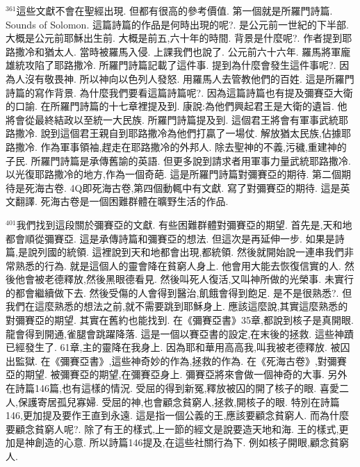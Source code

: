 \documentclass{book}
\begin{document}
$^{361}$這些文獻不會在聖經出現.
但都有很高的參考價值.
第一個就是所羅門詩篇.
Sounds of Solomon.
這篇詩篇的作品是何時出現的呢?.
是公元前一世紀的下半部.
大概是公元前耶穌出生前.
大概是前五,六十年的時間.
背景是什麼呢?.
作者提到耶路撒冷和猶太人.
當時被羅馬入侵.
上課我們也說了.
公元前六十六年.
羅馬將軍龐雄統攻陷了耶路撒冷.
所羅門詩篇記載了這件事.
提到為什麼會發生這件事呢?.
因為人沒有敬畏神.
所以神向以色列人發怒.
用羅馬人去管教他們的百姓.
這是所羅門詩篇的寫作背景.
為什麼我們要看這篇詩篇呢?.
因為這篇詩篇也有提及彌賽亞大衛的口諭.
在所羅門詩篇的十七章裡提及到.
康說:為他們興起君王是大衛的遺旨.
他將會從最終結政以至統一大民族.
所羅門詩篇提及到.
這個君王將會有軍事武統耶路撒冷.
說到這個君王親自到耶路撒冷為他們打贏了一場仗.
解放猶太民族,佔據耶路撒冷.
作為軍事領袖,趕走在耶路撒冷的外邦人.
除去聖神的不義,污穢,重建神的子民.
所羅門詩篇是承傳舊諭的英語.
但更多說到請求者用軍事力量武統耶路撒冷.
以光復耶路撒冷的地方,作為一個奇葩.
這是所羅門詩篇對彌賽亞的期待.
第二個期待是死海古卷.
4Q即死海古卷,第四個動輒中有文獻.
寫了對彌賽亞的期待.
這是英文翻譯.
死海古卷是一個困難群體在曠野生活的作品.

$^{401}$我們找到這段關於彌賽亞的文獻.
有些困難群體對彌賽亞的期望.
首先是,天和地都會順從彌賽亞.
這是承傳詩篇和彌賽亞的想法.
但這次是再延伸一步.
如果是詩篇,是說列國的統領.
這裡說到天和地都會出現,都統領.
然後就開始說一連串我們非常熟悉的行為.
就是這個人的靈會降在貧窮人身上.
他會用大能去恢復信實的人.
然後他會被老德釋放,然後黑眼德看見.
然後叫死人復活,又叫神所做的光榮事.
未實行的都會繼續做下去.
然後受傷的人會得到醫治,飢餓會得到飽足.
是不是很熟悉?.
但我們在這麼熟悉的想法之前,就不需要跳到耶穌身上.
應該這麼說,其實這麼熟悉的對彌賽亞的期望.
其實在舊約也能找到.
在《彌賽亞書》35章,都說到核子是真開眼.
龍會得到開通,雀腿會跳躍降落.
這是一個以賽亞書的設定,在末後的拯救.
這些神蹟已經發生了.
61章,主的靈降在我身上.
因為耶和華用高高我,叫我被老德釋放.
被囚出監獄.
在《彌賽亞書》,這些神奇妙的作為,拯救的作為.
在《死海古卷》,對彌賽亞的期望.
被彌賽亞的期望,在彌賽亞身上.
彌賽亞將來會做一個神奇的大事.
另外在詩篇146篇,也有這樣的情況.
受屈的得到新冤,釋放被囚的開了核子的眼.
喜愛二人,保護寄居孤兒寡婦.
受屈的神,也會顧念貧窮人,拯救,開核子的眼.
特別在詩篇146,更加提及要作王直到永遠.
這是指一個公義的王,應該要顧念貧窮人.
而為什麼要顧念貧窮人呢?.
除了有王的樣式,上一節的經文是說要造天地和海.
王的樣式,更加是神創造的心意.
所以詩篇146提及,在這些社關行為下.
例如核子開眼,顧念貧窮人.
\end{document}
